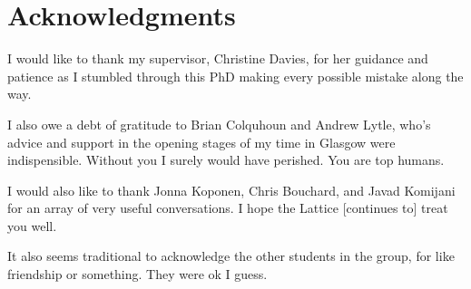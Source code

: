 \documentclass[a4paper,11pt,twoside]{ThesisStyle}
\begin{document}


\section*{Acknowledgments}

I would like to thank my supervisor, Christine Davies, for her guidance and patience as I stumbled through this PhD making every possible mistake along the way. 

I also owe a debt of gratitude to Brian Colquhoun and Andrew Lytle, who's advice and support in the opening stages of my time in Glasgow were indispensible. Without you I surely would have perished. You are top humans.

I would also like to thank Jonna Koponen, Chris Bouchard, and Javad Komijani for an array of very useful conversations. I hope the Lattice [continues to] treat you well.

It also seems traditional to acknowledge the other students in the group, for like friendship or something. They were ok I guess. 

\newpage

\tableofcontents
\mainmatter







% 

\listoffigures
%  
\listoftables




\end{document}
